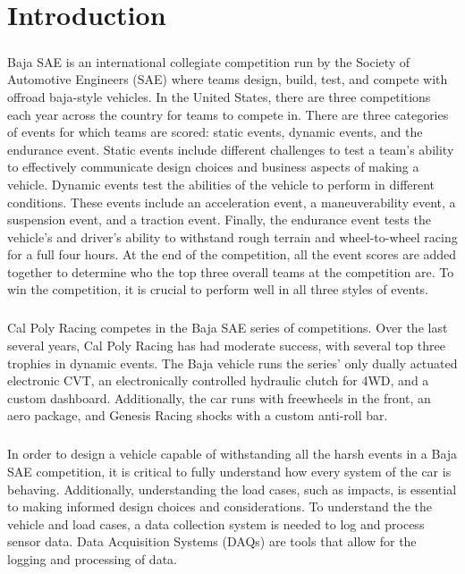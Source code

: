 \chapter{Introduction}

\paragraph{}
Baja SAE \cite{SAE} is an international collegiate competition run by the Society of Automotive Engineers (SAE) where teams design, build, test, and compete with offroad baja-style vehicles.
In the United States, there are three competitions each year across the country for teams to compete in. 
There are three categories of events for which teams are scored: static events, dynamic events, and the endurance event.  
Static events include different challenges to test a team's ability to effectively communicate design choices and business aspects of making a vehicle.  
Dynamic events test the abilities of the vehicle to perform in different conditions.  
These events include an acceleration event, a maneuverability event, a suspension event, and a traction event.  
Finally, the endurance event tests the vehicle's and driver's ability to withstand rough terrain and wheel-to-wheel racing for a full four hours.
At the end of the competition, all the event scores are added together to determine who the top three overall teams at the competition are.
To win the competition, it is crucial to perform well in all three styles of events.

\paragraph{}
Cal Poly Racing\cite{CalPolyRacing} competes in the Baja SAE series of competitions.
Over the last several years, Cal Poly Racing has had moderate success, with several top three trophies in dynamic events.
The Baja vehicle runs the series' only dually actuated electronic CVT, an electronically controlled hydraulic clutch for 4WD, and a custom dashboard.
Additionally, the car runs with freewheels in the front, an aero package, and Genesis Racing shocks with a custom anti-roll bar.

\paragraph{}
In order to design a vehicle capable of withstanding all the harsh events in a Baja SAE competition, it is critical to fully understand how every system of the car is behaving.
Additionally, understanding the load cases, such as impacts, is essential to making informed design choices and considerations.
To understand the the vehicle and load cases, a data collection system is needed to log and process sensor data.
Data Acquisition Systems (DAQs) are tools that allow for the logging and processing of data.

